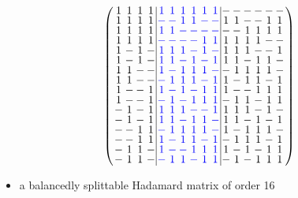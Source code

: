 \documentclass{beamer}
\newcommand{\bblue}[1]{\textcolor{blue}{#1}}
\begin{document}
\begin{frame}

  \[
    \arraycolsep=1.0pt\def\arraystretch{0.75}
    \left(\begin{array}{cccc|cccccc|cccccc}
            1&1&1&1&\bblue{1}&\bblue{1}&\bblue{1}&\bblue{1}&\bblue{1}&\bblue{1}&-&-&-&-&-&-\\
            1&1&1&1&\bblue{-}&\bblue{-}&\bblue{1}&\bblue{1}&\bblue{-}&\bblue{-}&1&1&-&-&1&1\\
            1&1&1&1&\bblue{1}&\bblue{1}&\bblue{-}&\bblue{-}&\bblue{-}&\bblue{-}&-&-&1&1&1&1\\
            1&1&1&1&\bblue{-}&\bblue{-}&\bblue{-}&\bblue{-}&\bblue{1}&\bblue{1}&1&1&1&1&-&-\\
            1&-&1&-&\bblue{1}&\bblue{1}&\bblue{1}&\bblue{-}&\bblue{1}&\bblue{-}&1&1&1&-&-&1\\
            1&-&1&-&\bblue{1}&\bblue{1}&\bblue{-}&\bblue{1}&\bblue{-}&\bblue{1}&1&1&-&1&1&-\\
            1&1&-&-&\bblue{1}&\bblue{-}&\bblue{1}&\bblue{1}&\bblue{1}&\bblue{-}&-&1&1&1&1&-\\
            1&1&-&-&\bblue{-}&\bblue{1}&\bblue{1}&\bblue{1}&\bblue{-}&\bblue{1}&1&-&1&1&-&1\\
            1&-&-&1&\bblue{1}&\bblue{-}&\bblue{1}&\bblue{-}&\bblue{1}&\bblue{1}&1&-&-&1&1&1\\
            1&-&-&1&\bblue{-}&\bblue{1}&\bblue{-}&\bblue{1}&\bblue{1}&\bblue{1}&-&1&1&-&1&1\\
            -&1&-&1&\bblue{1}&\bblue{1}&\bblue{1}&\bblue{-}&\bblue{-}&\bblue{1}&1&1&1&-&1&-\\
            -&1&-&1&\bblue{1}&\bblue{1}&\bblue{-}&\bblue{1}&\bblue{1}&\bblue{-}&1&1&-&1&-&1\\
            -&-&1&1&\bblue{-}&\bblue{1}&\bblue{1}&\bblue{1}&\bblue{1}&\bblue{-}&1&-&1&1&1&-\\
            -&-&1&1&\bblue{1}&\bblue{-}&\bblue{1}&\bblue{1}&\bblue{-}&\bblue{1}&-&1&1&1&-&1\\
            -&1&1&-&\bblue{1}&\bblue{-}&\bblue{-}&\bblue{1}&\bblue{1}&\bblue{1}&1&-&1&-&1&1\\
            -&1&1&-&\bblue{-}&\bblue{1}&\bblue{1}&\bblue{-}&\bblue{1}&\bblue{1}&-&1&-&1&1&1\\
          \end{array}\right)
      \]

      \begin{itemize}
      \item a balancedly splittable Hadamard matrix of order 16
      \end{itemize}

\end{frame}
\end{document}
